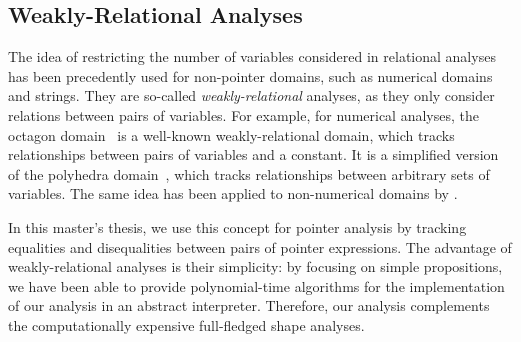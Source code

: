
\subsection{Weakly-Relational Analyses}

The idea of restricting the number of variables considered in relational analyses has been precedently used for non-pointer domains, such as numerical domains and strings.
They are so-called \emph{weakly-relational} analyses, as they only consider relations between pairs of variables.
For example, for numerical analyses, the octagon domain~\cite{octagon} is a well-known weakly-relational domain, which tracks relationships between pairs of variables and a constant.
It is a simplified version of the polyhedra domain~\cite{polyhedra}, which tracks relationships between arbitrary sets of variables.
The same idea has been applied to non-numerical domains by \textcite{SeidlETS2023}.

In this master's thesis, we use this concept for pointer analysis by tracking equalities and disequalities between pairs of pointer expressions.
The advantage of weakly-relational analyses is their simplicity: by focusing on simple propositions, we have been able to provide polynomial-time algorithms for the implementation of our analysis in an abstract interpreter.
Therefore, our analysis complements the computationally expensive full-fledged shape analyses.
